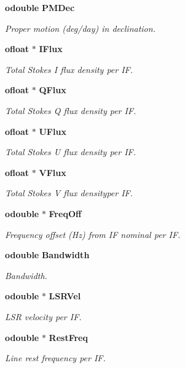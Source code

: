 \begin{CompactItemize}
{\bf odouble} {\bf PMDec}
\begin{CompactList}\small\item\em Proper motion (deg/day) in declination. \item\end{CompactList}\item 
{\bf ofloat} $\ast$ {\bf IFlux}
\begin{CompactList}\small\item\em Total Stokes I flux density per IF. \item\end{CompactList}\item 
{\bf ofloat} $\ast$ {\bf QFlux}
\begin{CompactList}\small\item\em Total Stokes Q flux density per IF. \item\end{CompactList}\item 
{\bf ofloat} $\ast$ {\bf UFlux}
\begin{CompactList}\small\item\em Total Stokes U flux density per IF. \item\end{CompactList}\item 
{\bf ofloat} $\ast$ {\bf VFlux}
\begin{CompactList}\small\item\em Total Stokes V flux densityper IF. \item\end{CompactList}\item 
{\bf odouble} $\ast$ {\bf Freq\-Off}
\begin{CompactList}\small\item\em Frequency offset (Hz) from IF nominal per IF. \item\end{CompactList}\item 
{\bf odouble} {\bf Bandwidth}
\begin{CompactList}\small\item\em Bandwidth. \item\end{CompactList}\item 
{\bf odouble} $\ast$ {\bf LSRVel}
\begin{CompactList}\small\item\em LSR velocity per IF. \item\end{CompactList}\item 
{\bf odouble} $\ast$ {\bf Rest\-Freq}
\begin{CompactList}\small\item\em Line rest frequency per IF. \item\end{CompactList}\end{CompactItemize}


